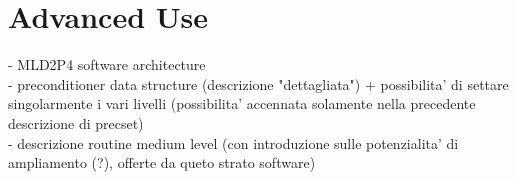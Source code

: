 \section{Advanced Use}\label{sec:advanced}

    - MLD2P4 software architecture \\
    - preconditioner data structure (descrizione "dettagliata") + possibilita' di settare singolarmente
      i vari livelli (possibilita' accennata solamente nella precedente descrizione di precset) \\
    - descrizione routine medium level (con introduzione sulle potenzialita' di ampliamento (?), offerte
      da queto strato software) \\


